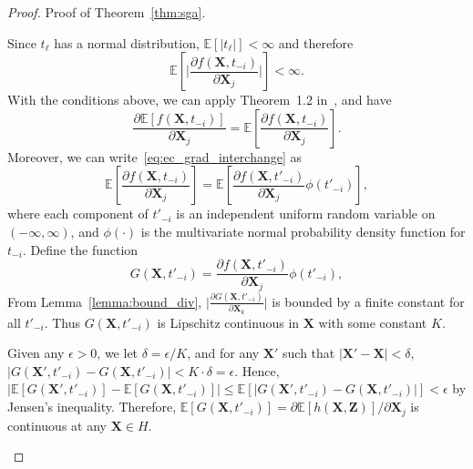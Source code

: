 \documentclass[paper=letter]{scrartcl}
\newcommand{\E}{\mathbb{E}}
\begin{document}
\begin{proof}{Proof of Theorem~\ref{thm:sga}.}
\begin{enumerate}
      Since $t_{\ell}$ has a normal distribution, $\E[\lvert t_{\ell} \rvert] < \infty$ and therefore
      \begin{equation*}
       \E\left[ \lvert \frac{\partial f(\bm{X}, t_{-i})}{\partial \bm{X}_j} \rvert \right] <  \infty.
      \end{equation*}
      With the conditions above, we can apply Theorem~1.2 in~\cite{Glasserman1991}, and have
      \begin{equation} \label{eq:ec_grad_interchange}
       \frac{\partial \E \left[ f(\bm{X}, t_{-i}) \right]}{\partial \bm{X}_j} = \E \left[ \frac{\partial f(\bm{X}, t_{-i})}{\partial \bm{X}_j} \right].
      \end{equation}
      Moreover, we can write~\eqref{eq:ec_grad_interchange} as
      \begin{equation*}
       \E \left[ \frac{\partial f(\bm{X}, t_{-i})}{\partial \bm{X}_j} \right] = \E \left[ \frac{\partial f(\bm{X}, t'_{-i})}{\partial \bm{X}_j} \phi(t'_{-i}) \right],
      \end{equation*}
      where each component of $t'_{-i}$ is an independent uniform random variable on $(-\infty, \infty)$, and $\phi(\cdot)$ is the multivariate normal probability density function for $t_{-i}$. Define the function
      \begin{equation*}
       G(\bm{X}, t'_{-i}) = \frac{\partial f(\bm{X}, t'_{-i})}{\partial \bm{X}_j} \phi(t'_{-i}),
      \end{equation*}
      From Lemma~\ref{lemma:bound_div}, $\lvert \frac{\partial G(\bm{X}, t'_{-i})}{\partial \bm{X}_k} \rvert$ is bounded by a finite constant for all $t'_{-i}$. Thus $G(\bm{X}, t'_{-i})$ is Lipschitz continuous in $\bm{X}$ with some constant $K$. 
      
      Given any $\epsilon > 0$, we let $\delta = \epsilon / K$, and for any $\bm{X}'$ such that $\lvert \bm{X}' - \bm{X} \rvert < \delta$, $\lvert G(\bm{X}', t'_{-i}) - G(\bm{X}, t'_{-i}) \rvert < K \cdot \delta = \epsilon$. Hence, $\lvert \E \left[G(\bm{X}', t'_{-i})\right] - \E \left[G(\bm{X}, t'_{-i})\right] \rvert \leq \E \left[ \lvert G(\bm{X}', t'_{-i}) - G(\bm{X}, t'_{-i}) \rvert \right] < \epsilon$ by Jensen's inequality. 
      Therefore, $\E \left[ G(\bm{X}, t'_{-i})\right]
      = \partial \E[h(\bm{X},\bm{Z})] / \partial \bm{X}_j$
      is continuous at any $\bm{X} \in H$. 
      


\end{enumerate}
\end{proof}
\end{document}

